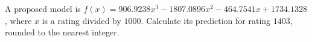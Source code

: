 A proposed model is $ f(x)=906.9238x^3-1807.0896x^2-464.7541x+1734.1328 $, where $ x $ is a rating divided by $ 1000 $. Calculate its prediction for rating $ 1403 $, rounded to the nearest integer.
